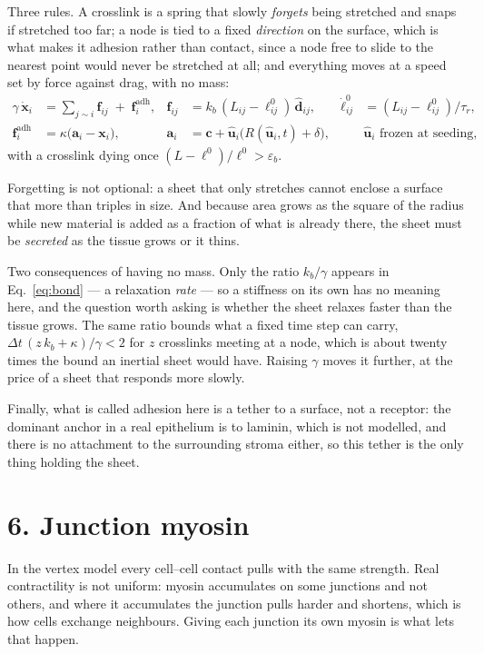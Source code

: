 \documentclass[10pt,a4paper]{article}
\begin{document}
Three rules. A crosslink is a spring that slowly \emph{forgets} being stretched and snaps if stretched
too far; a node is tied to a fixed \emph{direction} on the surface, which is what makes it adhesion
rather than contact, since a node free to slide to the nearest point would never be stretched at all;
and everything moves at a speed set by force against drag, with no mass:
%
\begin{align}
\gamma\,\dot{\mathbf x}_i &= \sum_{j\sim i}\mathbf f_{ij} \;+\; \mathbf f^{\text{adh}}_i, &
\mathbf f_{ij}&=k_b\,(L_{ij}-\ell^0_{ij})\,\hat{\mathbf d}_{ij}, &
\dot\ell^0_{ij}&=(L_{ij}-\ell^0_{ij})/\tau_r,
\label{eq:bond}\\[2pt]
\mathbf f^{\text{adh}}_i&=\kappa\bigl(\mathbf a_i-\mathbf x_i\bigr), &
\mathbf a_i&=\mathbf c+\hat{\mathbf u}_i\bigl(R(\hat{\mathbf u}_i,t)+\delta\bigr), &
&\hat{\mathbf u}_i \text{ frozen at seeding,}
\label{eq:integrin}
\end{align}
%
with a crosslink dying once $(L-\ell^0)/\ell^0>\varepsilon_b$.

Forgetting is not optional: a sheet that only stretches cannot enclose a surface that more than triples
in size. And because area grows as the square of the radius while new material is added as a fraction of
what is already there, the sheet must be \emph{secreted} as the tissue grows or it thins.

Two consequences of having no mass. Only the ratio $k_b/\gamma$ appears in Eq.~\eqref{eq:bond} --- a
relaxation \emph{rate} --- so a stiffness on its own has no meaning here, and the question worth asking
is whether the sheet relaxes faster than the tissue grows. The same ratio bounds what a fixed time step
can carry, $\Delta t\,(z\,k_b+\kappa)/\gamma<2$ for $z$ crosslinks meeting at a node, which is about
twenty times the bound an inertial sheet would have. Raising $\gamma$ moves it further, at the price of a
sheet that responds more slowly.

Finally, what is called adhesion here is a tether to a surface, not a receptor: the dominant anchor in a
real epithelium is to laminin, which is not modelled, and there is no attachment to the surrounding
stroma either, so this tether is the only thing holding the sheet.

\section*{6.\; Junction myosin}

In the vertex model every cell--cell contact pulls with the same strength. Real contractility is not
uniform: myosin accumulates on some junctions and not others, and where it accumulates the junction
pulls harder and shortens, which is how cells exchange neighbours. Giving each junction its own myosin
is what lets that happen.
\end{document}
